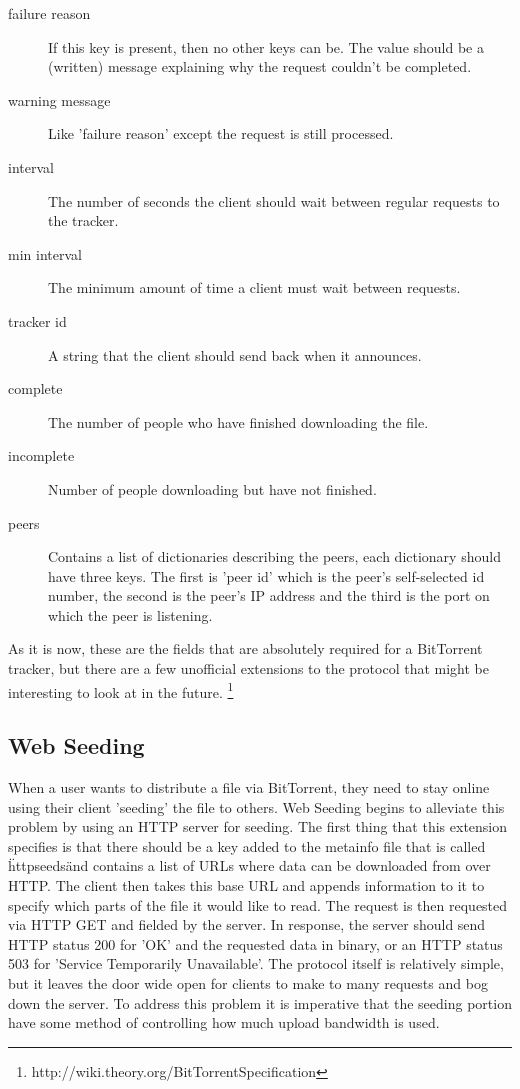 \documentclass[a4paper,12pt]{report}
\begin{document}
\begin{description}
\item[failure reason] If this key is present, then no other keys can be. The value should be a (written) message explaining why the request couldn't be completed.
\item[warning message] Like 'failure reason' except the request is still processed.
\item[interval] The number of seconds the client should wait between regular requests to the tracker.
\item[min interval] The minimum amount of time a client must wait between requests.
\item[tracker id] A string that the client should send back when it announces.
\item[complete] The number of people who have finished downloading the file.
\item[incomplete] Number of people downloading but have not finished.
\item[peers] Contains a list of dictionaries describing the peers, each dictionary should have three keys. The first is 'peer id' which is the peer's self-selected id number, the second is the peer's IP address and the third is the port on which the peer is listening.
\end{description}

As it is now, these are the fields that are absolutely required for a BitTorrent tracker, but there are a few unofficial extensions to the protocol that might be interesting to look at in the future. \footnote{http://wiki.theory.org/BitTorrentSpecification}



\subsection{Web Seeding}
When a user wants to distribute a file via BitTorrent, they need to stay online using their client 'seeding' the file to others.
Web Seeding begins to alleviate this problem by using an HTTP server for seeding.
The first thing that this extension specifies is that there should be a key added to the metainfo file that is called \"httpseeds\" and contains a list of URLs where data can be downloaded from over HTTP.
The client then takes this base URL and appends information to it to specify which parts of the file it would like to read.
The request is then requested via HTTP GET and fielded by the server.
In response, the server should send HTTP status 200 for 'OK' and the requested data in binary, or an HTTP status 503 for 'Service Temporarily Unavailable'. 
The protocol itself is relatively simple, but it leaves the door wide open for clients to make to many requests and bog down the server.
To address this problem it is imperative that the seeding portion have some method of controlling how much upload bandwidth is used.
\end{document}
